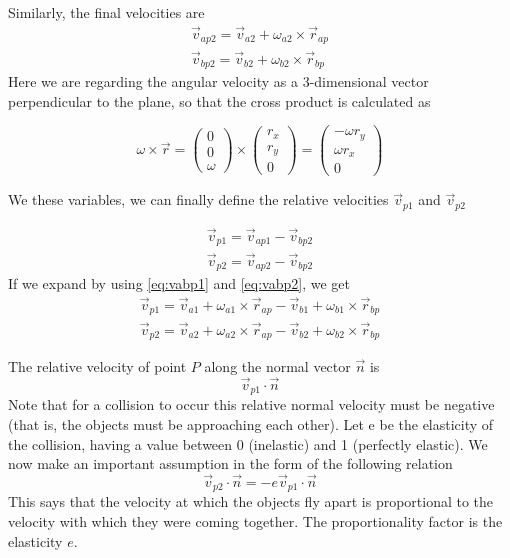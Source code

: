 Similarly, the final velocities are
\begin{equation} \label{eq:vabp2}
	\begin{split}
		\vec v_{ap2} = \vec v_{a2} + \omega_{a2} \times \vec r_{ap}\\
		\vec v_{bp2} = \vec v_{b2} + \omega_{b2} \times \vec r_{bp}
	\end{split}
\end{equation}
Here we are regarding the angular velocity as a 3-dimensional vector
perpendicular to the plane, so that the cross product is calculated as

$$ \omega \times \vec r = \begin{pmatrix} 0\\0\\\omega \end{pmatrix} \times
	\begin{pmatrix} r_x\\r_y\\0 \end{pmatrix} = \begin{pmatrix} -\omega r_y \\
		\omega r_x  \\0\end{pmatrix}  $$

We these variables, we can finally define the relative velocities $\vec
	v_{p1}$ and $\vec v_{p2}$

\begin{equation}
	\label{eq:vp1}
	\begin{split}
		\vec v_{p1} = \vec v_{ap1} - \vec v_{bp2}\\
		\vec v_{p2} = \vec v_{ap2} - \vec v_{bp2}
	\end{split}
\end{equation}
If we expand by using \ref{eq:vabp1} and \ref{eq:vabp2}, we get
\begin{equation}
	\begin{split}
		\vec v_{p1} = \vec v_{a1} + \omega_{a1} \times \vec r_{ap} - \vec v_{b1}
		+ \omega_{b1} \times \vec r_{bp}\\
		\vec v_{p2} = \vec v_{a2} + \omega_{a2} \times \vec r_{ap} - \vec v_{b2} + \omega_{b2} \times \vec r_{bp}
	\end{split}
\end{equation}

The relative velocity of point $P$ along the normal vector $\vec n$ is
$$ \vec v_{p1} \cdot \vec n $$
Note that for a collision to occur this relative normal velocity must be
negative (that is, the objects must be approaching each other). Let e be the
elasticity of the collision, having a value between 0 (inelastic) and 1
(perfectly elastic). We now make an important assumption in the form of the
following relation
\begin{equation}
	\label{eq:vp2n}
	\vec v_{p2} \cdot \vec n = - e \vec v_{p1} \cdot \vec n
\end{equation}
This says that the velocity at which the objects fly apart is proportional to
the velocity with which they were coming together. The proportionality factor is
the elasticity $e$.

